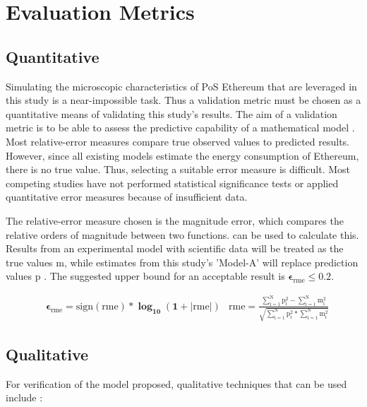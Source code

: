 \section {Evaluation Metrics}

\subsection{Quantitative}
\label{MethoologyErrorQuant}
Simulating the microscopic characteristics of PoS Ethereum that are leveraged in this study is a near-impossible task. Thus a validation metric must be chosen as a quantitative means of validating this study's results. The aim of a validation metric is to be able to assess the predictive capability of a mathematical model \cite{Kat2012ValidationError}. Most relative-error measures compare true observed values to predicted results. However, since all existing models estimate the energy consumption of Ethereum, there is no true value. Thus, selecting a suitable error measure is difficult. Most competing studies have not performed statistical significance tests or applied quantitative error measures because of insufficient data.

The relative-error measure chosen is the magnitude error, which compares the relative orders of magnitude between two functions.  can be used to calculate this. Results from an experimental model with scientific data will be treated as the true values  $\boldsymbol{\mathrm{m}}$, while estimates from this study's 'Model-A' will replace prediction values $\boldsymbol{\mathrm{p}}$ \cite{RussellErrorMeasure}. The suggested upper bound for an acceptable result is $\boldsymbol{\epsilon_\mathrm{rme} \leq 0.2}$.

\begin{align}
\label{eqn:ErrorMeasureEqn}
    &\boldsymbol{\epsilon_\mathrm{rme} = \mathrm{sign(rme)} * \log_{10} (1 + |\mathrm{rme}|)}
    &\boldsymbol{ \mathrm{rme} = \mathrm{\frac{\mathrm{\sum\limits_{i=1}^{N} p_{i}^{2}} - \mathrm{\sum\limits_{i=1}^{N} m_{i}^{2}}}{\sqrt{\mathrm{\sum\limits_{i=1}^{N} p_{i}^{2}} * \mathrm{\sum\limits_{i=1}^{N} m_{i}^{2}}}}}}
\end{align}

\subsection{Qualitative}
\label{QualModelEvalMEthodology}
For verification of the model proposed, qualitative techniques that can be used include \cite{Al-Aomar2015ModelTechniques}:

